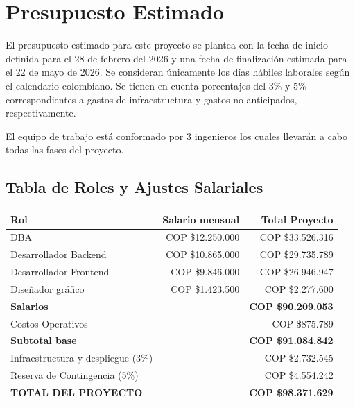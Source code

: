 \documentclass[12pt, a4paper]{article}
\begin{document}
\section{Presupuesto Estimado}

El presupuesto estimado para este proyecto se plantea con la fecha de inicio definida para el 28 de febrero del 2026 y una fecha de finalización estimada para el 22 de mayo de 2026. Se consideran únicamente los días hábiles laborales según el calendario colombiano. Se tienen en cuenta porcentajes del 3\% y 5\% correspondientes a gastos de infraestructura y gastos no anticipados, respectivamente.

El equipo de trabajo está conformado por 3 ingenieros los cuales llevarán a cabo todas las fases del proyecto.

\subsection*{Tabla de Roles y Ajustes Salariales}

\begin{tabular}{@{} l r r @{}}
    \toprule
    \textbf{Rol} & \textbf{Salario mensual} & \textbf{Total Proyecto} \\
    \midrule
    DBA                      & COP \$12.250.000 & COP \$33.526.316 \\
    Desarrollador Backend    & COP \$10.865.000 & COP \$29.735.789 \\
    Desarrollador Frontend   & COP \$9.846.000  & COP \$26.946.947 \\
    Diseñador gráfico        & COP \$1.423.500  & COP \$2.277.600  \\
    \midrule
    \textbf{Salarios}                        & & \textbf{COP \$90.209.053} \\
    Costos Operativos                        & & COP \$875.789 \\
    \textbf{Subtotal base}                   & & \textbf{COP \$91.084.842} \\
    Infraestructura y despliegue (3\%)       & & COP \$2.732.545 \\
    Reserva de Contingencia (5\%)            & & COP \$4.554.242 \\
    \midrule
    \textbf{TOTAL DEL PROYECTO}              & & \textbf{COP \$98.371.629} \\
    \bottomrule
\end{tabular}
\end{document}
